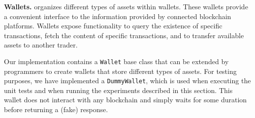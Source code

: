 \textbf{Wallets.}
\ModelName{} organizes different types of assets within wallets.
These wallets provide a convenient interface to the information provided by connected blockchain platforms.
Wallets expose functionality to query the existence of specific transactions, fetch the content of specific transactions, and to transfer available assets to another trader.

Our implementation contains a \texttt{Wallet} base class that can be extended by programmers to create wallets that store different types of assets.
For testing purposes, we have implemented a \texttt{DummyWallet}, which is used when executing the unit tests and when running the experiments described in this section.
This wallet does not interact with any blockchain and simply waits for some duration before returning a (fake) response.

